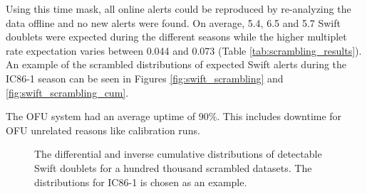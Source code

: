 Using this time mask, all online alerts could be reproduced by re-analyzing the 
data offline and no new alerts were found. On average, 5.4, 6.5 and 5.7 Swift 
doublets were expected during the different seasons while the higher multiplet 
rate expectation varies between 0.044 and 0.073 (Table 
\ref{tab:scrambling_results}). An example of the scrambled distributions of 
expected Swift alerts during the IC86-1 season can be seen in Figures
\ref{fig:swift_scrambling} and \ref{fig:swift_scrambling_cum}.

The OFU system had an average uptime of 90\%. 
This includes downtime for OFU unrelated reasons like calibration runs.

\begin{figure}[h]
\centering
 \captionsetup{width=.9\textwidth}
\caption{The differential and inverse cumulative distributions of 
detectable Swift doublets for a hundred thousand scrambled datasets. The 
distributions for 
IC86-1 is chosen as an example.}
\end{figure}



